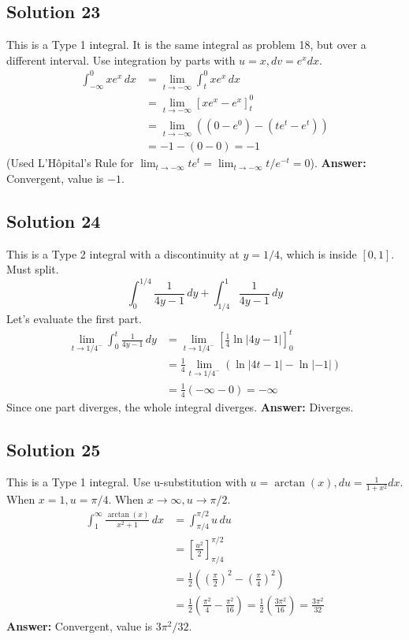 \documentclass{article}
\begin{document}
\subsection*{Solution 23}
This is a Type 1 integral. It is the same integral as problem 18, but over a different interval. Use integration by parts with $u=x, dv=e^x dx$.
\begin{align*}
\int_{-\infty}^{0} xe^x \,dx &= \lim_{t \to -\infty} \int_{t}^{0} xe^x \,dx \\
&= \lim_{t \to -\infty} [xe^x - e^x]_{t}^{0} \\
&= \lim_{t \to -\infty} \left( (0-e^0) - (te^t - e^t) \right) \\
&= -1 - (0-0) = -1
\end{align*}
(Used L'Hôpital's Rule for $\lim_{t \to -\infty} t e^t = \lim_{t \to -\infty} t/e^{-t} = 0$).
\textbf{Answer:} Convergent, value is $-1$.

\subsection*{Solution 24}
This is a Type 2 integral with a discontinuity at $y=1/4$, which is inside $[0,1]$. Must split.
\[ \int_{0}^{1/4} \frac{1}{4y-1} \,dy + \int_{1/4}^{1} \frac{1}{4y-1} \,dy \]
Let's evaluate the first part.
\begin{align*}
\lim_{t \to 1/4^-} \int_{0}^{t} \frac{1}{4y-1} \,dy &= \lim_{t \to 1/4^-} \left[ \frac{1}{4}\ln|4y-1| \right]_{0}^{t} \\
&= \frac{1}{4} \lim_{t \to 1/4^-} (\ln|4t-1| - \ln|-1|) \\
&= \frac{1}{4} (-\infty - 0) = -\infty
\end{align*}
Since one part diverges, the whole integral diverges.
\textbf{Answer:} Diverges.

\subsection*{Solution 25}
This is a Type 1 integral. Use u-substitution with $u=\arctan(x), du = \frac{1}{1+x^2}dx$. When $x=1, u=\pi/4$. When $x \to \infty, u \to \pi/2$.
\begin{align*}
\int_{1}^{\infty} \frac{\arctan(x)}{x^2+1} \,dx &= \int_{\pi/4}^{\pi/2} u \,du \\
&= \left[ \frac{u^2}{2} \right]_{\pi/4}^{\pi/2} \\
&= \frac{1}{2} \left( \left(\frac{\pi}{2}\right)^2 - \left(\frac{\pi}{4}\right)^2 \right) \\
&= \frac{1}{2} \left( \frac{\pi^2}{4} - \frac{\pi^2}{16} \right) = \frac{1}{2} \left( \frac{3\pi^2}{16} \right) = \frac{3\pi^2}{32}
\end{align*}
\textbf{Answer:} Convergent, value is $3\pi^2/32$.
\end{document}
